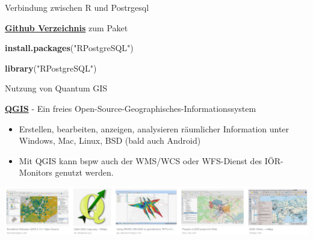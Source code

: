 \documentclass[ignorenonframetext,]{beamer}
\newenvironment{Shaded}{\begin{snugshade}}{\end{snugshade}}
\newcommand{\KeywordTok}[1]{\textcolor[rgb]{0.26,0.66,0.93}{\textbf{#1}}}
\newcommand{\NormalTok}[1]{\textcolor[rgb]{0.74,0.68,0.62}{#1}}
\newcommand{\StringTok}[1]{\textcolor[rgb]{0.02,0.61,0.04}{#1}}
\providecommand{\tightlist}{%
  \setlength{\itemsep}{0pt}\setlength{\parskip}{0pt}}
\begin{document}
\begin{frame}[fragile]{Verbindung zwischen R und Postrgesql}
\protect\hypertarget{verbindung-zwischen-r-und-postrgesql}{}

\begin{block}{\href{https://github.com/tomoakin/RPostgreSQL}{\textbf{Github
Verzeichnis}} zum Paket}

\begin{Shaded}
\begin{Highlighting}[]
\KeywordTok{install.packages}\NormalTok{(}\StringTok{"RPostgreSQL"}\NormalTok{)}
\end{Highlighting}
\end{Shaded}

\begin{Shaded}
\begin{Highlighting}[]
\KeywordTok{library}\NormalTok{(}\StringTok{"RPostgreSQL"}\NormalTok{)}
\end{Highlighting}
\end{Shaded}

\end{block}

\end{frame}

\begin{frame}{Nutzung von Quantum GIS}
\protect\hypertarget{nutzung-von-quantum-gis}{}

\begin{block}{\href{https://www.qgis.org/de/site/}{\textbf{QGIS}} - Ein
freies Open-Source-Geographisches-Informationssystem}

\begin{itemize}
\tightlist
\item
  Erstellen, bearbeiten, anzeigen, analysieren räumlicher Information
  unter Windows, Mac, Linux, BSD (bald auch Android)
\item
  Mit QGIS kann bspw auch der WMS/WCS oder WFS-Dienst des IÖR-Monitors
  genutzt werden.
\end{itemize}

\includegraphics{figure/Bilder_qgis.PNG}

\end{block}

\end{frame}
\end{document}
